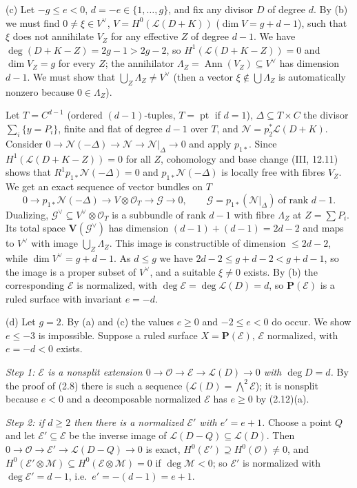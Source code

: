 \documentclass[11pt]{article}
\begin{document}
(c) Let $-g\le e<0$, $d=-e\in\{1,\dots,g\}$, and fix any divisor $D$ of degree $d$. By (b) we must find $0\ne\xi\in V^\vee$, $V=H^0(\mathcal L(D+K))$ ($\dim V=g+d-1$), such that $\xi$ does not annihilate $V_Z$ for any effective $Z$ of degree $d-1$. We have $\deg(D+K-Z)=2g-1>2g-2$, so $H^1(\mathcal L(D+K-Z))=0$ and $\dim V_Z=g$ for every $Z$; the annihilator $\Lambda_Z=\operatorname{Ann}(V_Z)\subseteq V^\vee$ has dimension $d-1$. We must show that $\bigcup_Z\Lambda_Z\ne V^\vee$ (then a vector $\xi\notin\bigcup\Lambda_Z$ is automatically nonzero because $0\in\Lambda_Z$).

Let $T=C^{d-1}$ (ordered $(d-1)$-tuples, $T=\operatorname{pt}$ if $d=1$), $\Delta\subseteq T\times C$ the divisor $\sum_i\{y=P_i\}$, finite and flat of degree $d-1$ over $T$, and $\mathcal N=p_2^*\mathcal L(D+K)$. Consider $0\to\mathcal N(-\Delta)\to\mathcal N\to\mathcal N|_\Delta\to0$ and apply $p_{1*}$. Since $H^1(\mathcal L(D+K-Z))=0$ for all $Z$, cohomology and base change (III, 12.11) shows that $R^1p_{1*}\mathcal N(-\Delta)=0$ and $p_{1*}\mathcal N(-\Delta)$ is locally free with fibres $V_Z$. We get an exact sequence of vector bundles on $T$
\[ 0\to p_{1*}\mathcal N(-\Delta)\to V\otimes\mathcal O_T\to\mathcal G\to0,\qquad\mathcal G=p_{1*}(\mathcal N|_\Delta)\ \text{of rank }d-1 . \]
Dualizing, $\mathcal G^\vee\subseteq V^\vee\otimes\mathcal O_T$ is a subbundle of rank $d-1$ with fibre $\Lambda_Z$ at $Z=\sum P_i$. Its total space $\mathbf V(\mathcal G^\vee)$ has dimension $(d-1)+(d-1)=2d-2$ and maps to $V^\vee$ with image $\bigcup_Z\Lambda_Z$. This image is constructible of dimension $\le2d-2$, while $\dim V^\vee=g+d-1$. As $d\le g$ we have $2d-2\le g+d-2<g+d-1$, so the image is a proper subset of $V^\vee$, and a suitable $\xi\ne0$ exists. By (b) the corresponding $\mathcal E$ is normalized, with $\deg\mathcal E=\deg\mathcal L(D)=d$, so $\mathbf P(\mathcal E)$ is a ruled surface with invariant $e=-d$.

(d) Let $g=2$. By (a) and (c) the values $e\ge0$ and $-2\le e<0$ do occur. We show $e\le-3$ is impossible. Suppose a ruled surface $X=\mathbf P(\mathcal E)$, $\mathcal E$ normalized, with $e=-d<0$ exists.

\emph{Step 1: $\mathcal E$ is a nonsplit extension $0\to\mathcal O\to\mathcal E\to\mathcal L(D)\to0$ with $\deg D=d$.} By the proof of (2.8) there is such a sequence ($\mathcal L(D)=\bigwedge^2\mathcal E$); it is nonsplit because $e<0$ and a decomposable normalized $\mathcal E$ has $e\ge0$ by (2.12)(a).

\emph{Step 2: if $d\ge2$ then there is a normalized $\mathcal E'$ with $e'=e+1$.} Choose a point $Q$ and let $\mathcal E'\subseteq\mathcal E$ be the inverse image of $\mathcal L(D-Q)\subseteq\mathcal L(D)$. Then $0\to\mathcal O\to\mathcal E'\to\mathcal L(D-Q)\to0$ is exact, $H^0(\mathcal E')\supseteq H^0(\mathcal O)\ne0$, and $H^0(\mathcal E'\otimes\mathcal M)\subseteq H^0(\mathcal E\otimes\mathcal M)=0$ if $\deg\mathcal M<0$; so $\mathcal E'$ is normalized with $\deg\mathcal E'=d-1$, i.e.\ $e'=-(d-1)=e+1$.
\end{document}
